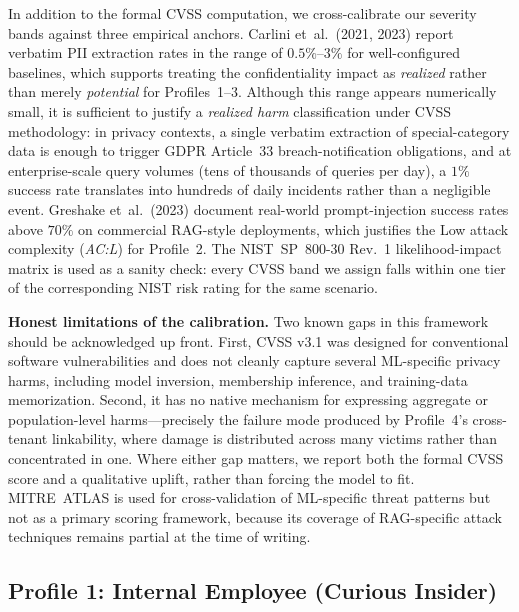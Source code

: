 In addition to the formal CVSS computation, we cross-calibrate our
severity bands against three empirical anchors. Carlini et~al.\ (2021,
2023) report verbatim PII extraction rates in the range of
$0.5\%$--$3\%$ for well-configured baselines, which supports treating the
confidentiality impact as \emph{realized} rather than merely
\emph{potential} for Profiles~1--3. Although this range appears
numerically small, it is sufficient to justify a \emph{realized harm}
classification under CVSS methodology: in privacy contexts, a single
verbatim extraction of special-category data is enough to trigger GDPR
Article~33 breach-notification obligations, and at enterprise-scale
query volumes (tens of thousands of queries per day), a $1\%$ success
rate translates into hundreds of daily incidents rather than a
negligible event. Greshake et~al.\ (2023) document real-world
prompt-injection success rates above $70\%$ on commercial RAG-style
deployments, which justifies the Low attack complexity (\emph{AC:L})
for Profile~2. The NIST~SP~800-30 Rev.~1 likelihood-impact matrix is
used as a sanity check: every CVSS band we assign falls within one
tier of the corresponding NIST risk rating for the same scenario.

\begin{limitbox}
\small\textbf{Honest limitations of the calibration.} Two known gaps
in this framework should be acknowledged up front. First, CVSS v3.1
was designed for conventional software vulnerabilities and does not
cleanly capture several ML-specific privacy harms, including model
inversion, membership inference, and training-data memorization.
Second, it has no native mechanism for expressing aggregate or
population-level harms---precisely the failure mode produced by
Profile~4's cross-tenant linkability, where damage is distributed
across many victims rather than concentrated in one. Where either gap
matters, we report both the formal CVSS score and a qualitative
uplift, rather than forcing the model to fit. MITRE~ATLAS is used for
cross-validation of ML-specific threat patterns but not as a primary
scoring framework, because its coverage of RAG-specific attack
techniques remains partial at the time of writing.
\end{limitbox}


\newpage
\subsection{Profile 1: Internal Employee (Curious Insider)}

